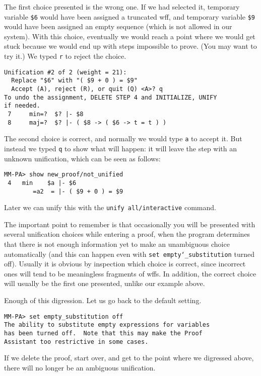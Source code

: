 The first choice presented is the wrong one.  If we had selected it,
temporary variable \texttt{\$6} would have been assigned a truncated
wff, and temporary variable \texttt{\$9} would have been assigned an
empty sequence (which is not allowed in our system).  With this choice,
eventually we would reach a point where we would get stuck because
we would end up with steps impossible to prove.  (You may want to
try it.)  We typed \texttt{r} to reject the choice.

\begin{verbatim}
Unification #2 of 2 (weight = 21):
  Replace "$6" with "( $9 + 0 ) = $9"
  Accept (A), reject (R), or quit (Q) <A>? q
To undo the assignment, DELETE STEP 4 and INITIALIZE, UNIFY
if needed.
 7     min=?  $? |- $8
 8     maj=?  $? |- ( $8 -> ( $6 -> t = t ) )
\end{verbatim}

The second choice is correct, and normally we would type \texttt{a}
to accept it.  But instead we typed \texttt{q} to show what will happen:
it will leave the step with an unknown unification, which can be
seen as follows:

\begin{verbatim}
MM-PA> show new_proof/not_unified
 4   min    $a |- $6
        =a2  = |- ( $9 + 0 ) = $9
\end{verbatim}

Later we can unify this with the \texttt{unify all/interactive} command.

The important point to remember is that occasionally you will be
presented with several unification choices while entering a proof, when
the program determines that there is not enough information yet to make
an unambiguous choice automatically (and this can happen even with
\texttt{set empty{\char`\_}substitution} turned off).  Usually it is
obvious by inspection which choice is correct, since incorrect ones will
tend to be meaningless fragments of wffs.  In addition, the correct
choice will usually be the first one presented, unlike our example
above.

Enough of this digression.  Let us go back to the default setting.

\begin{verbatim}
MM-PA> set empty_substitution off
The ability to substitute empty expressions for variables
has been turned off.  Note that this may make the Proof
Assistant too restrictive in some cases.
\end{verbatim}

If we delete the proof, start over, and get to the point where
we digressed above, there will no longer be an ambiguous unification.

